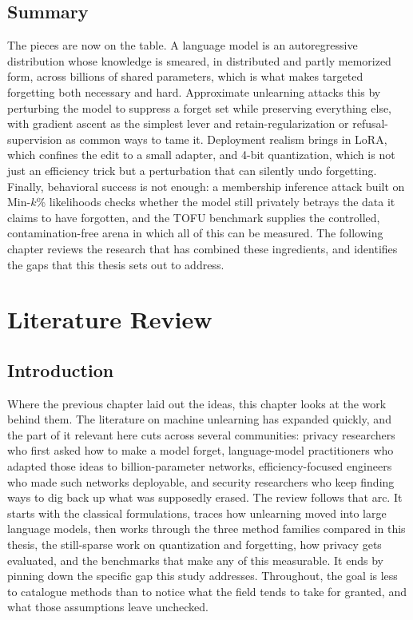 \documentclass[a4paper,12pt]{report}
\begin{document}
\section{Summary}
The pieces are now on the table. A language model is an autoregressive distribution whose knowledge is smeared, in distributed and partly memorized form, across billions of shared parameters, which is what makes targeted forgetting both necessary and hard. Approximate unlearning attacks this by perturbing the model to suppress a forget set while preserving everything else, with gradient ascent as the simplest lever and retain-regularization or refusal-supervision as common ways to tame it. Deployment realism brings in LoRA, which confines the edit to a small adapter, and 4-bit quantization, which is not just an efficiency trick but a perturbation that can silently undo forgetting. Finally, behavioral success is not enough: a membership inference attack built on Min-$k$\% likelihoods checks whether the model still privately betrays the data it claims to have forgotten, and the TOFU benchmark supplies the controlled, contamination-free arena in which all of this can be measured. The following chapter reviews the research that has combined these ingredients, and identifies the gaps that this thesis sets out to address.
\chapter{Literature Review}
\label{chap:literature}

\section{Introduction}
Where the previous chapter laid out the ideas, this chapter looks at the work behind them. The literature on machine unlearning has expanded quickly, and the part of it relevant here cuts across several communities: privacy researchers who first asked how to make a model forget, language-model practitioners who adapted those ideas to billion-parameter networks, efficiency-focused engineers who made such networks deployable, and security researchers who keep finding ways to dig back up what was supposedly erased. The review follows that arc. It starts with the classical formulations, traces how unlearning moved into large language models, then works through the three method families compared in this thesis, the still-sparse work on quantization and forgetting, how privacy gets evaluated, and the benchmarks that make any of this measurable. It ends by pinning down the specific gap this study addresses. Throughout, the goal is less to catalogue methods than to notice what the field tends to take for granted, and what those assumptions leave unchecked.
\end{document}

